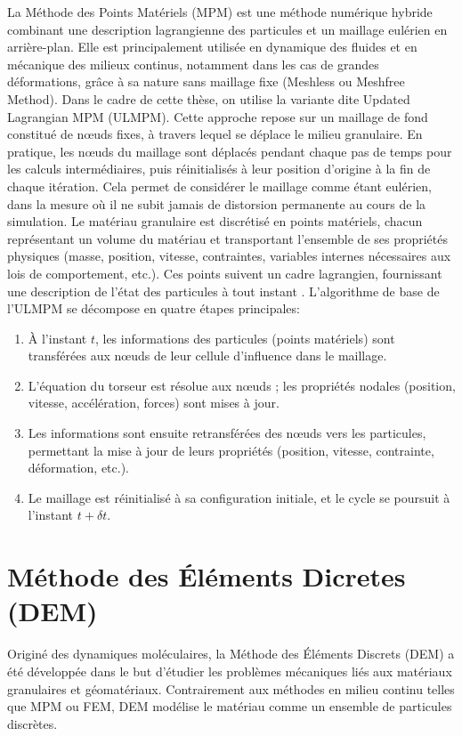 \documentclass[a4paper,12pt]{report}
\begin{document}
La Méthode des Points Matériels (MPM) est une méthode numérique hybride combinant une description lagrangienne des particules et un maillage eulérien en arrière-plan. Elle est principalement utilisée en dynamique des fluides et en mécanique des milieux continus, notamment dans les cas de grandes déformations, grâce à sa nature sans maillage fixe (Meshless ou Meshfree Method)\citep{duverger2023multi}.
Dans le cadre de cette thèse, on utilise la variante dite Updated Lagrangian MPM (ULMPM). Cette approche repose sur un maillage de fond constitué de n\oe uds fixes, à travers lequel se déplace le milieu granulaire. En pratique, les n\oe uds du maillage sont déplacés pendant chaque pas de temps pour les calculs intermédiaires, puis réinitialisés à leur position d’origine à la fin de chaque itération. Cela permet de considérer le maillage comme étant eulérien, dans la mesure où il ne subit jamais de distorsion permanente au cours de la simulation.
Le matériau granulaire est discrétisé en points matériels, chacun représentant un volume du matériau et transportant l’ensemble de ses propriétés physiques (masse, position, vitesse, contraintes, variables internes nécessaires aux lois de comportement, etc.). Ces points suivent un cadre lagrangien, fournissant une description de l’état des particules à tout instant \citep{danies2018application}.
L’algorithme de base de l’ULMPM se décompose en quatre étapes principales:
\begin{enumerate}
  \item À l’instant $t$, les informations des particules (points matériels) sont transférées aux n\oe uds de leur cellule d’influence dans le maillage.
  \item L’équation du torseur est résolue aux n\oe uds ; les propriétés nodales (position, vitesse, accélération, forces) sont mises à jour.
  \item Les informations sont ensuite retransférées des n\oe uds vers les particules, permettant la mise à jour de leurs propriétés (position, vitesse, contrainte, déformation, etc.).
  \item Le maillage est réinitialisé à sa configuration initiale, et le cycle se poursuit à l’instant $t + \delta t$.
\end{enumerate}


\section{Méthode des Éléments Dicretes (DEM)}
Originé des dynamiques moléculaires, la Méthode des Éléments Discrets (DEM) a été développée dans le but d'étudier les problèmes mécaniques liés aux matériaux granulaires et géomatériaux. Contrairement aux méthodes en milieu continu telles que MPM ou FEM, DEM modélise le matériau comme un ensemble de particules discrètes.
\end{document}
